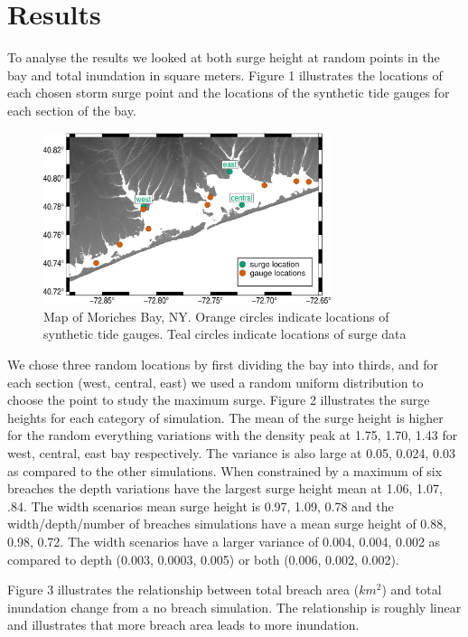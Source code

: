 \documentclass{coastal_paper}
\begin{document}
\section{Results}
To analyse the results we looked at both surge height at random points in the bay and total inundation in square meters. Figure 1 illustrates the locations of each chosen storm surge point and the locations of the synthetic tide gauges for each section of the bay.
\begin{figure}
    \centering
    \includegraphics[width=0.75\textwidth]{dot_map.pdf}
    \caption{Map of Moriches Bay, NY. Orange circles indicate locations of synthetic tide gauges. Teal circles indicate locations of surge data}
    \label{fig1}
\end{figure}
We chose three random locations by first dividing the bay into thirds, and for each section (west, central, east) we used a random uniform distribution to choose the point to study the maximum surge. Figure 2 illustrates the surge heights for each category of simulation. The mean of the surge height is higher for the random everything variations with the density peak at 1.75, 1.70, 1.43 for west, central, east bay respectively. The variance is also large at 0.05, 0.024, 0.03 as compared to the other simulations. When constrained by a maximum of six breaches the depth variations have the largest surge height mean at 1.06, 1.07, .84. The width scenarios mean surge height is 0.97, 1.09, 0.78 and the width/depth/number of breaches simulations have a mean surge height of 0.88, 0.98, 0.72. The width scenarios have a larger variance of 0.004, 0.004, 0.002 as compared to depth (0.003, 0.0003, 0.005) or both (0.006, 0.002, 0.002). 

Figure 3 illustrates the relationship between total breach area ($km^2$) and total inundation change from a no breach simulation. The relationship is roughly linear and illustrates that more breach area leads to more inundation.
\end{document}
